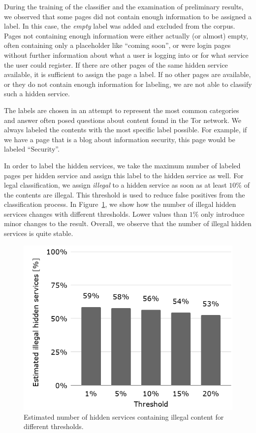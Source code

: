 During  the training of the classifier and the examination of preliminary results, we observed that some pages did not contain enough information to be assigned a label. In this case, the \emph{empty} label was added and excluded from the corpus. Pages not containing enough information were either actually (or almost) empty, often containing only a placeholder like ``coming soon'', or were login pages without further information about what a user is logging into or for what service the user could register. If there are other pages of the same hidden service available, it is sufficient to assign the page a label. If no other pages are available, or they do not contain enough information for labeling, we are not able to classify such a hidden service.

The labels are chosen in an attempt to represent the most common categories and answer often posed questions about content found in the Tor network.
We always labeled the contents with the most specific label possible. For example, if we have a page that is a blog about information security, this page would be labeled ``Security''.

In order to label the hidden services, we take the maximum number of labeled pages per hidden service and assign this label to the hidden service as well. For legal classification, we assign \emph{illegal} to a hidden service as soon as at least $10\%$ of the contents are illegal. This threshold is used to reduce false positives from the classification process. In Figure~\ref{fig:legalityByThreshold}, we show how the number of illegal hidden services changes with different thresholds. Lower values than $1\%$ only introduce minor changes to the result. Overall, we observe that  the number of illegal hidden services is quite stable.
 


\begin{figure}[H]
    \centering
    \includegraphics[width=0.8 \linewidth]{images/legalHostsByThreshold.png}
    \caption{Estimated number of hidden services containing illegal content for different thresholds.}
    \label{fig:legalityByThreshold}
\end{figure}

